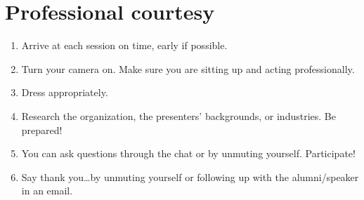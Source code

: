 \documentclass[11pt]{article}
\begin{document}
\section{Professional courtesy}
\label{sec:org8f68aea}
\begin{enumerate}
\item Arrive at each session on time, early if possible.
\item Turn your camera on. Make sure you are sitting up and acting professionally.
\item Dress appropriately.
\item Research the organization, the presenters’ backgrounds, or industries. Be prepared!
\item You can ask questions through the chat or by unmuting yourself. Participate!
\item Say thank you\ldots{}by unmuting yourself or following up with the alumni/speaker in an email.
\end{enumerate}
\end{document}
